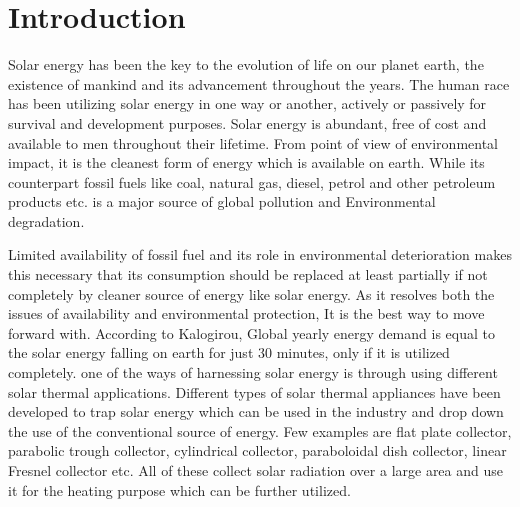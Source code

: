 \newcommand{\etas}{\ensuremath{\eta_{\mathrm{s}}}}


\chapter{Introduction}



Solar energy has been the key to the evolution of life on our planet earth, the existence of mankind and its advancement throughout the years. The human race has been utilizing solar energy in one way or another, actively or passively for survival and development purposes. Solar energy is abundant, free of cost and available to men throughout their lifetime. From point of view of environmental impact, it is the cleanest form of energy which is available on earth. While its counterpart fossil fuels like coal, natural gas, diesel, petrol and other petroleum products etc. is a major source of global pollution and Environmental degradation.

Limited availability of fossil fuel and its role in environmental deterioration makes this necessary that its consumption should be replaced at least partially if not completely by cleaner source of energy like solar energy. As it resolves both the issues of availability and environmental protection, It is the best way to move forward with. According to Kalogirou\citep{KALOGIROU2004231}, Global yearly energy demand is equal to the solar energy falling on earth for just 30 minutes, only if it is utilized completely. one of the ways of harnessing solar energy is through using different solar thermal applications. Different types of solar thermal appliances have been developed to trap solar energy which can be used in the industry and drop down the use of the conventional source of energy. Few examples are flat plate collector, parabolic trough collector, cylindrical collector, paraboloidal dish collector, linear Fresnel collector etc. All of these collect solar radiation over a large area and use it for the heating purpose which can be further utilized.

